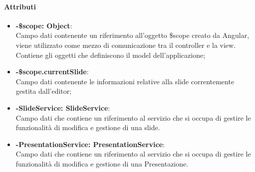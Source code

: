 	\paragraph{Attributi}
	\begin{itemize}
		\item \textbf{-\$scope: Object}:\\
			Campo dati contenente un riferimento all'oggetto \$scope creato da Angular, viene utilizzato come mezzo di comunicazione tra il controller e la view. Contiene gli oggetti che definiscono il model dell'applicazione;
		\item \textbf{-\$scope.currentSlide}:\\
			Campo dati contenente le informazioni relative alla slide correntemente gestita dall'editor;
		\item \textbf{-SlideService: SlideService}:\\
			Campo dati che contiene un riferimento al servizio che si occupa di gestire le funzionalità di modifica e gestione di una slide.
		\item \textbf{-PresentationService: PresentationService}:\\
			Campo dati che contiene un riferimento al servizio che si occupa di gestire le funzionalità di modifica e gestione di una Presentazione.
	\end{itemize}
	
